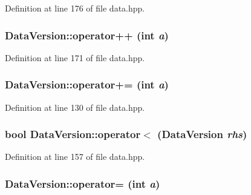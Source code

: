 Definition at line 176 of file data.hpp.\hypertarget{struct_data_version_a3d5a1c141bbfbb2035f2fb4ec74b8ba7}{
\subsubsection[{operator++}]{ DataVersion::operator++ (int {\em a})}}
\label{struct_data_version_a3d5a1c141bbfbb2035f2fb4ec74b8ba7}


Definition at line 171 of file data.hpp.\hypertarget{struct_data_version_a0079199056aad2cd9489a54942d0e602}{
\subsubsection[{operator+=}]{ DataVersion::operator+= (int {\em a})}}
\label{struct_data_version_a0079199056aad2cd9489a54942d0e602}


Definition at line 130 of file data.hpp.\hypertarget{struct_data_version_a18e35a067946065ace0c4c2de7846d46}{
\subsubsection[{operator$<$}]{\setlength{\rightskip}{0pt plus 5cm}bool DataVersion::operator$<$ ({\bf DataVersion} {\em rhs})}}
\label{struct_data_version_a18e35a067946065ace0c4c2de7846d46}


Definition at line 157 of file data.hpp.\hypertarget{struct_data_version_aae15f8e09ffada6e3ab052de902928ce}{
\subsubsection[{operator=}]{ DataVersion::operator= (int {\em a})}}
\label{struct_data_version_aae15f8e09ffada6e3ab052de902928ce}


